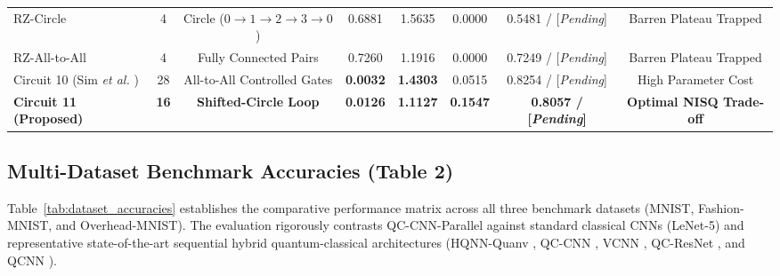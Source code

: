 \documentclass[journal]{IEEEtran}
\begin{document}
\begin{table}[!htbp]
{\begin{tabular}{lccccccc}
RZ-Circle & 4 & Circle ($0 \to 1 \to 2 \to 3 \to 0$) & 0.6881 & 1.5635 & 0.0000 & 0.5481 / [\textit{Pending}] & Barren Plateau Trapped \\
RZ-All-to-All & 4 & Fully Connected Pairs & 0.7260 & 1.1916 & 0.0000 & 0.7249 / [\textit{Pending}] & Barren Plateau Trapped \\
Circuit 10 (Sim \textit{et al.} \cite{sim2019expressibility}) & 28 & All-to-All Controlled Gates & \textbf{0.0032} & \textbf{1.4303} & 0.0515 & 0.8254 / [\textit{Pending}] & High Parameter Cost \\
\textbf{Circuit 11 (Proposed)} & \textbf{16} & \textbf{Shifted-Circle Loop} & \textbf{0.0126} & \textbf{1.1127} & \textbf{0.1547} & \textbf{0.8057 / [\textit{Pending}]} & \textbf{Optimal NISQ Trade-off} \\
\bottomrule
\end{tabular}
}
\end{table}

\subsection{Multi-Dataset Benchmark Accuracies (Table 2)}
\label{subsec:multi_dataset_benchmark}

Table~\ref{tab:dataset_accuracies} establishes the comparative performance matrix across all three benchmark datasets (MNIST, Fashion-MNIST, and Overhead-MNIST). The evaluation rigorously contrasts QC-CNN-Parallel against standard classical CNNs (LeNet-5) and representative state-of-the-art sequential hybrid quantum-classical architectures (HQNN-Quanv \cite{senokosov2024quantum}, QC-CNN \cite{henderson2020quanvolutional}, VCNN \cite{huang2021experimental}, QC-ResNet \cite{kashif2024resqnets}, and QCNN \cite{chen2023qcnn}).
\end{document}
